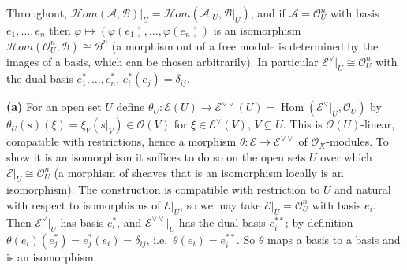 \documentclass[11pt]{article}
\begin{document}
\pf
Throughout, $\mathcal{H}om(\mathcal A,\mathcal B)|_U=\mathcal{H}om(\mathcal A|_U,\mathcal B|_U)$, and if $\mathcal A=\mathcal O_U^n$ with basis $e_1,\dots,e_n$ then $\varphi\mapsto(\varphi(e_1),\dots,\varphi(e_n))$ is an isomorphism $\mathcal{H}om(\mathcal O_U^n,\mathcal B)\cong\mathcal B^n$ (a morphism out of a free module is determined by the images of a basis, which can be chosen arbitrarily). In particular $\mathcal E^\vee|_U\cong\mathcal O_U^n$ with the dual basis $e_1^*,\dots,e_n^*$, $e_i^*(e_j)=\delta_{ij}$.

\textbf{(a)} For an open set $U$ define $\theta_U:\mathcal E(U)\to\mathcal E^{\vee\vee}(U)=\operatorname{Hom}(\mathcal E^\vee|_U,\mathcal O_U)$ by $\theta_U(s)(\xi)=\xi_V(s|_V)\in\mathcal O(V)$ for $\xi\in\mathcal E^\vee(V)$, $V\subseteq U$. This is $\mathcal O(U)$-linear, compatible with restrictions, hence a morphism $\theta:\mathcal E\to\mathcal E^{\vee\vee}$ of $\mathcal O_X$-modules. To show it is an isomorphism it suffices to do so on the open sets $U$ over which $\mathcal E|_U\cong\mathcal O_U^n$ (a morphism of sheaves that is an isomorphism locally is an isomorphism). The construction is compatible with restriction to $U$ and natural with respect to isomorphisms of $\mathcal E|_U$, so we may take $\mathcal E|_U=\mathcal O_U^n$ with basis $e_i$. Then $\mathcal E^\vee|_U$ has basis $e_i^*$, and $\mathcal E^{\vee\vee}|_U$ has the dual basis $e_i^{**}$; by definition $\theta(e_i)(e_j^*)=e_j^*(e_i)=\delta_{ij}$, i.e.\ $\theta(e_i)=e_i^{**}$. So $\theta$ maps a basis to a basis and is an isomorphism.
\end{document}
